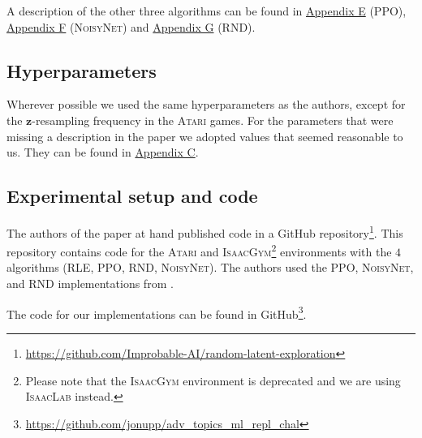 \documentclass[10pt]{article} %
\begin{document}
\noindent A description of the other three algorithms can be found in \hyperlink{link-ppo}{Appendix E} (\textsc{PPO}), \hyperlink{link-noisynet}{Appendix F} (\textsc{NoisyNet}) and \hyperlink{link-rnd}{Appendix G} (\textsc{RND}).

\hypertarget{hyperparameter-subsection}{\subsection{Hyperparameters}}

Wherever possible we used the same hyperparameters as the authors, except for the $\textbf{z}$-resampling frequency in the \textsc{Atari} games. For the parameters that were missing a description in the paper we adopted values that seemed reasonable to us. They can be found in \hyperlink{appendix-hyperparams}{Appendix C}.

\hypertarget{experimental-setup}{\subsection{Experimental setup and code}}

\noindent The authors of the paper at hand published code in a GitHub repository\footnote{\href{https://github.com/Improbable-AI/random-latent-exploration}{https://github.com/Improbable-AI/random-latent-exploration}}. This repository contains code for the \textsc{Atari} and \textsc{IsaacGym}\footnote{Please note that the \textsc{IsaacGym} environment is deprecated and we are using \textsc{IsaacLab} instead.} environments with the $4$ algorithms (\textsc{RLE}, \textsc{PPO}, \textsc{RND}, \textsc{NoisyNet}). The authors used the \textsc{PPO}, \textsc{NoisyNet}, and \textsc{RND} implementations from \cite{clearnrl-paper}.

The code for our implementations can be found in GitHub\footnote{\href{https://github.com/jonupp/adv_topics_ml_repl_chal}{https://github.com/jonupp/adv\_topics\_ml\_repl\_chal}}. 
\end{document}
